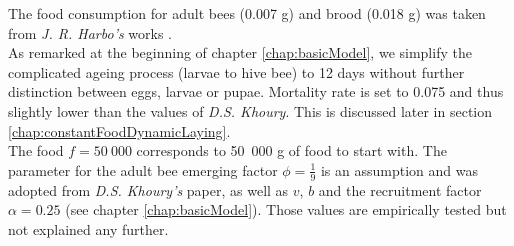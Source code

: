 			The food consumption for adult bees (0.007 g) and brood (0.018 g) was taken from \textit{J. R. Harbo's} works \cite{harbo93}.\\
					
			As remarked at the beginning of chapter \ref{chap:basicModel}, we simplify the complicated ageing process (larvae to hive bee) to 12 days without further distinction between eggs, larvae or pupae. Mortality rate is set to 0.075 and thus slightly lower than the values of \textit{D.S. Khoury}. This is discussed later in section \ref{chap:constantFoodDynamicLaying}.\\

			The food $f=50~000$ corresponds to 50~000 g of food to start with. The parameter for the adult bee emerging factor $\phi=\frac{1}{9}$ is an assumption and was adopted from \textit{D.S. Khoury's} paper, as well as $v$, $b$ and the recruitment factor $\alpha = 0.25$ (see chapter \ref{chap:basicModel}). Those values are empirically tested but not explained any further.\\
						
